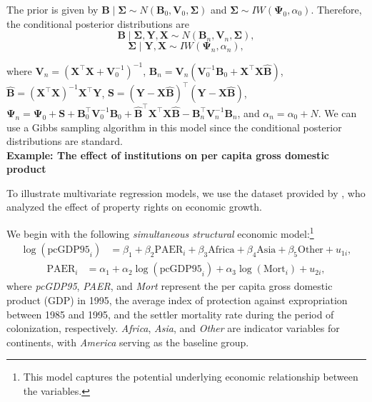 The prior is given by $\bm{B}\mid\bm{\Sigma}\sim{N}(\bm{B}_0,\bm{V}_0, \bm{\Sigma})$ and $\bm{\Sigma}\sim{I}{W}(\bm{\Psi}_0,\alpha_0)$. Therefore, the conditional posterior distributions are
\begin{equation*}
	\bm{B}\mid\bm{\Sigma}, \bm{Y}, \bm{X} \sim{N}(\bm{B}_n, \bm{V}_n, \bm{\Sigma}), 
\end{equation*}
\begin{equation*}
	\bm{\Sigma}\mid \bm{Y}, \bm{X} \sim {I}{W}(\bm{\Psi}_n, \alpha_n),
\end{equation*}

where $\bm{V}_n=(\bm{X}^{\top}\bm{X}+\bm{V}_0^{-1})^{-1}$, $\bm{B}_n=\bm{V}_n(\bm{V}_0^{-1}\bm{B}_0 + \bm{X}^{\top}\bm{X}\hat{\bm{B}})$, $\hat{\bm{B}}=(\bm{X}^{\top}\bm{X})^{-1}\bm{X}^{\top}\bm{Y}$, ${\bm{S}}=(\bm{Y}-\bm{X}\hat{\bm{B}})^{\top}(\bm{Y}-\bm{X}\hat{\bm{B}})$, $\bm{\Psi}_n = {\bm{\Psi}}_{0}+{\bm{S}}+{\bm{B}}_{0}^{\top}{\bm{V}}_{0}^{-1}{\bm{B}}_{0}+\widehat{\bm{B}}^{\top}{\bm{X}}^{\top}{\bm{X}}\widehat{\bm{B}}-{\bm{B}}_n^{\top}{\bm{V}}_n^{-1}{\bm{B}}_n$, and $\alpha_n = \alpha_0 + N$. We can use a Gibbs sampling algorithm in this model since the conditional posterior distributions are standard.\\

\textbf{Example: The effect of institutions on per capita gross domestic product}

To illustrate multivariate regression models, we use the dataset provided by \cite{Acemoglu2001}, who analyzed the effect of property rights on economic growth.

We begin with the following \textit{simultaneous structural} economic model:\footnote{This model captures the potential underlying economic relationship between the variables.}
\begin{align}\label{eq:str1}
	\log(\text{pcGDP95}_i) &= \beta_1 + \beta_2 \text{PAER}_i + \beta_3 \text{Africa} + \beta_4 \text{Asia} + \beta_5 \text{Other} + u_{1i},
\end{align}
\begin{align}\label{eq:str2}
	\text{PAER}_i &= \alpha_1 + \alpha_2 \log(\text{pcGDP95}_i) + \alpha_3 \log(\text{Mort}_i) + u_{2i},
\end{align}
where \textit{pcGDP95}, \textit{PAER}, and \textit{Mort} represent the per capita gross domestic product (GDP) in 1995, the average index of protection against expropriation between 1985 and 1995, and the settler mortality rate during the period of colonization, respectively. \textit{Africa}, \textit{Asia}, and \textit{Other} are indicator variables for continents, with \textit{America} serving as the baseline group.

